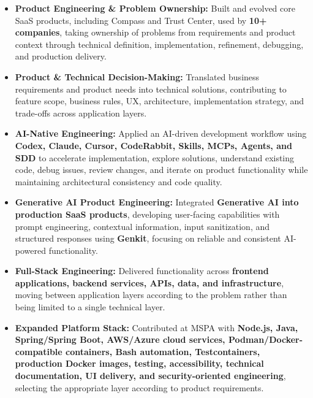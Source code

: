\documentclass[10pt,a4paper]{article}
\begin{document}
\begin{itemize}

    \item
    \textbf{Product Engineering \& Problem Ownership:}
    Built and evolved core SaaS products, including Compass and
    Trust Center, used by \textbf{10+ companies}, taking ownership
    of problems from requirements and product context through
    technical definition, implementation, refinement, debugging,
    and production delivery.

    \item
    \textbf{Product \& Technical Decision-Making:}
    Translated business requirements and product needs into
    technical solutions, contributing to feature scope, business
    rules, UX, architecture, implementation strategy, and
    trade-offs across application layers.

    \item
    \textbf{AI-Native Engineering:}
    Applied an AI-driven development workflow using
    \textbf{Codex, Claude, Cursor, CodeRabbit, Skills, MCPs,
    Agents, and SDD} to accelerate implementation, explore
    solutions, understand existing code, debug issues, review
    changes, and iterate on product functionality while maintaining
    architectural consistency and code quality.

    \item
    \textbf{Generative AI Product Engineering:}
    Integrated \textbf{Generative AI into production SaaS products},
    developing user-facing capabilities with prompt engineering,
    contextual information, input sanitization, and structured
    responses using \textbf{Genkit}, focusing on reliable and
    consistent AI-powered functionality.

    \item
    \textbf{Full-Stack Engineering:}
    Delivered functionality across \textbf{frontend applications,
    backend services, APIs, data, and infrastructure}, moving
    between application layers according to the problem rather
    than being limited to a single technical layer.

    \item
    \textbf{Expanded Platform Stack:}
    Contributed at MSPA with \textbf{Node.js, Java, Spring/Spring Boot,
    AWS/Azure cloud services, Podman/Docker-compatible containers,
    Bash automation, Testcontainers, production Docker images, testing,
    accessibility, technical documentation, UI delivery, and security-oriented engineering},
    selecting the appropriate layer according to product requirements.


\end{itemize}
\end{document}
